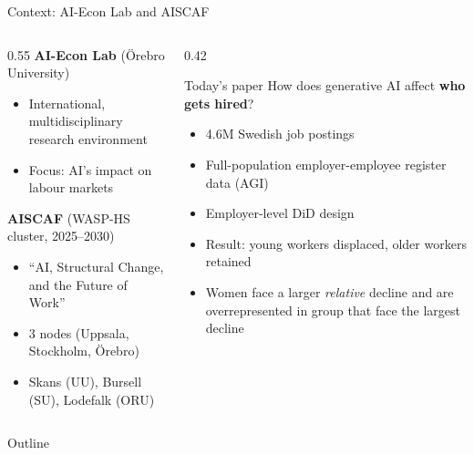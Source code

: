 \documentclass[aspectratio=169,11pt]{beamer}
\begin{document}
\begin{frame}{Context: AI-Econ Lab and AISCAF}
\begin{columns}[T]
\begin{column}{0.55\textwidth}
\textbf{AI-Econ Lab} (Örebro University)
\begin{itemize}
    \item International, multidisciplinary research environment
    \item Focus: AI's impact on labour markets
\end{itemize}
\vspace{3mm}
\textbf{AISCAF} (WASP-HS cluster, 2025--2030)
\begin{itemize}
    \item ``AI, Structural Change, and the Future of Work''
    \item 3 nodes (Uppsala, Stockholm, Örebro)
    \item Skans (UU), Bursell (SU), Lodefalk (ORU)
\end{itemize}
\end{column}
\begin{column}{0.42\textwidth}
\begin{block}{Today's paper}
How does generative AI affect \textbf{who gets hired}?\\[3mm]
\footnotesize
\begin{itemize}
    \item 4.6M Swedish job postings
    \item Full-population employer-employee register data (AGI)
    \item Employer-level DiD design
    \item Result: young workers displaced, older workers retained 
    \item Women face a larger \textit{relative} decline and are overrepresented in group that face the largest decline 
\end{itemize}
\end{block}
\end{column}
\end{columns}
\end{frame}

\begin{frame}{Outline}
\tableofcontents
\end{frame}
\end{document}
